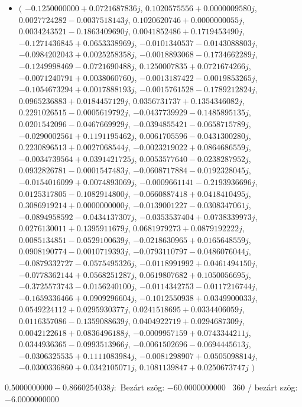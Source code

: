 \documentclass[14pt,a4paper]{article}
\begin{document}
\begin{itemize}
\item
$\big($
$-0.1250000000+0.0721687836j$, $0.1020575556+0.0000009580j$, $0.0027724282-0.0037518143j$, $0.1020620746+0.0000000055j$, $0.0034243521-0.1863409690j$, $0.0041852486+0.1719453490j$, $-0.1271436845+0.0653338969j$, $-0.0101340537-0.0143088803j$, $-0.0984202043+0.0025258358j$, $-0.0018893068-0.1734662289j$, $-0.1249998469-0.0721690488j$, $0.1250007835+0.0721674266j$, $-0.0071240791+0.0038060760j$, $-0.0013187422-0.0019853265j$, $-0.1054673294+0.0017888193j$, $-0.0015761528-0.1789212824j$, $0.0965236883+0.0184457129j$, $0.0356731737+0.1354346082j$, $0.2291026515-0.0005619792j$, $-0.0437739929-0.1485895135j$, $0.0201542096-0.0467669929j$, $-0.0394855421-0.0658715789j$, $-0.0290002561+0.1191195462j$, $0.0061705596-0.0431300280j$, $0.2230896513+0.0027068544j$, $-0.0023219022+0.0864686559j$, $-0.0034739564+0.0391421725j$, $0.0053577640-0.0238287952j$, $0.0932826781-0.0001547483j$, $-0.0608717884-0.0192328045j$, $-0.0154016099+0.0074893069j$, $-0.0009661141-0.2193936696j$, $0.0125317805-0.1082914800j$, $-0.0660887418+0.0418410495j$, $0.3086919214+0.0000000000j$, $-0.0139001227-0.0308347061j$, $-0.0894958592-0.0434137307j$, $-0.0353537404+0.0738339973j$, $0.0276130011+0.1395911679j$, $0.0681979273+0.0879192222j$, $0.0085134851-0.0529100639j$, $-0.0218630965+0.0165648559j$, $0.0908190774-0.0010719393j$, $-0.0793110797-0.0486076044j$, $-0.0879332727-0.0575495326j$, $-0.0118991992+0.0461494150j$, $-0.0778362144+0.0568251287j$, $0.0619807682+0.1050056695j$, $-0.3725573743-0.0156240100j$, $-0.0114342753-0.0117216744j$, $-0.1659336466+0.0909296604j$, $-0.1012550938+0.0349900033j$, $0.0549224112+0.0295930377j$, $0.0241518695+0.0334406059j$, $0.0116357086-0.1359088639j$, $0.0404922719+0.0294687309j$, $0.0042122618+0.0836496188j$, $-0.0009957159+0.0743344211j$, $0.0344936365-0.0993513966j$, $-0.0061502696-0.0694445613j$, $-0.0306325535+0.1111083984j$, $-0.0081298907+0.0505098814j$, $-0.0300336860+0.0342105071j$, $0.1081139847+0.0250673747j$
$\big)$
\end{itemize}
$0.5000000000-0.8660254038j$:\
Bezárt szög: $-60.0000000000$ \
360 / bezárt szög: $-6.0000000000$\
\end{document}
